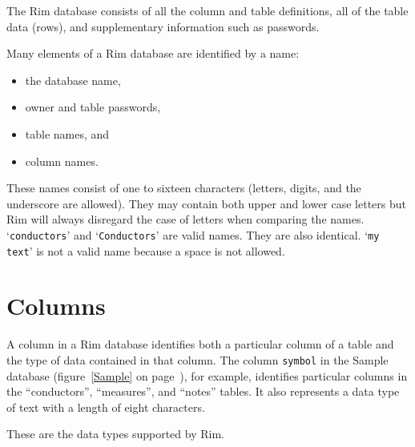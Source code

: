 \documentclass[11pt,a4paper]{report}
\begin{document}
 
The Rim database consists of all the column and table
definitions, all of the table data (rows),
and supplementary information such as passwords.
 
Many elements of a Rim database are identified by a name:
\begin{itemize}
  \item  the database name,
  \item  owner and table passwords,
  \item  table names, and
  \item column names.
\end{itemize}
These names consist of one to sixteen
characters (letters, digits, and the underscore are allowed).
They may contain both upper and lower case letters but Rim
will always disregard the case of letters when comparing the names.
`\verb|conductors|' and `\verb|Conductors|' are valid names.  They are also
identical.  `\verb!my text!' is not a valid name because
a space is not allowed.
 
\section{Columns}
A column in a Rim database identifies both a particular
column of a table and the type of data contained in that
column.  The column \verb!symbol! in the Sample database
(figure~\ref{Sample} on page~\pageref{Sample}),
for example, identifies particular
columns in the ``conductors'', ``measures'', and ``notes'' tables.
It also represents a data type of text with a length of
eight characters.
 
These are the data types supported by Rim.
 
\end{document}

